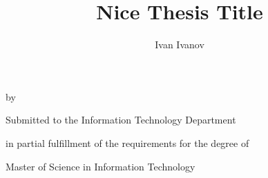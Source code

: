 
\title{Nice Thesis Title}

\author{Ivan Ivanov}

\makeatletter
\begin{titlepage}
\begin{center}
	

{\LARGE{\bf\@title}} \par by \par {\Large\@author} \par
{\large Submitted to the Information Technology Department \par in partial fulfillment of the requirements for the degree of \par Master of Science in Information Technology}


\end{center}
\end{titlepage}
\makeatother